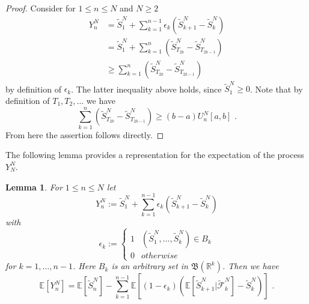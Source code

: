\documentclass[phd]{UWMThesis}
\newcommand{\E}{\mathbb{E}}
\newcommand{\F}{\mathcal{F}}
\newcommand{\StN}[1]{\tilde{S}_{#1}^N}
\newcommand{\FtN}[1]{\tilde{\F}_{#1}^N}
\newcommand{\YN}[1]{Y_{#1}^N}
\newcommand{\UNab}[1]{U_{#1}^N[a,b]}
\newcommand{\mdot}{\textrm{ .}}
\renewcommand{\.}{\textrm{ .}}
\newtheorem{lemma}[thm]{Lemma}
\theoremstyle{definition}
\numberwithin{thm}{chapter}
\begin{document}
%
\begin{proof}
	Consider for $1\leq n\leq N$ and $N\geq 2$
	\begin{align*}
	Y_n^N &= \StN{1} + \sum_{k=1}^{n-1}\epsilon_k(\StN{k+1}-\StN{k})\\
	&= \StN{1} + \sum_{k=1}^{n}(\StN{T_{2k}}-\StN{T_{2k-1}})\\
	&\geq \sum_{k=1}^{n}(\StN{T_{2k}}-\StN{T_{2k-1}})
	\end{align*}
	by definition of $\epsilon_k$. The latter inequality above holds, since $\StN{1}\geq 0$. Note that by definition of $T_1, T_2, \dots$ we have
	$$\sum_{k=1}^{n}(\StN{T_{2k}}-\StN{T_{2k-1}}) \geq (b-a)\UNab{n}\mdot$$
	From here the assertion follows directly.
\end{proof}
%
The following lemma provides a representation for the expectation of the process $Y_N^N$.
\begin{lemma}
	\label{lem:optional_skipping}
	For $1\leq n\leq N$ let
	$$\YN{n} := \StN{1} + \sum_{k=1}^{n-1} \epsilon_k (\StN{k+1} - \StN{k}) $$
	with
	\[ \epsilon_k := \begin{cases} 
	1 & (\StN{1},\dots,\StN{k})\in B_k \\
	0 & otherwise 
	\end{cases}
	\]
	for $k=1,\dots, n-1$. Here $B_k$ is an arbitrary set in $\mathfrak{B}(\mathbb{R}^k)$. Then we have
	\begin{equation}
	\E[\YN{n}] = \E[\StN{n}] - \sum_{k=1}^{n-1}\E\left[(1-\epsilon_k)\left(\E[\StN{k+1}|\FtN{k}]  - \StN{k} \right)\right]\mdot
	\label{eq:ineq_yk}
	\end{equation}
\end{lemma}
%
\end{document}
